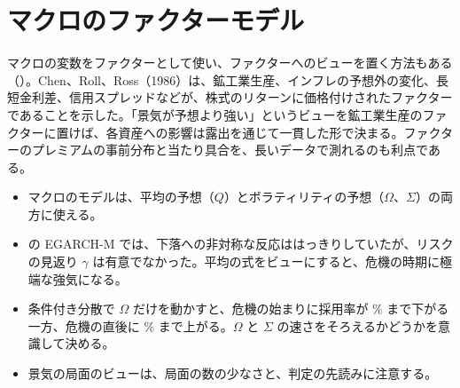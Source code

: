 \section{マクロのファクターモデル}

マクロの変数をファクターとして使い、ファクターへのビューを置く方法もある（）。Chen、Roll、Ross（1986）は、鉱工業生産、インフレの予想外の変化、長短金利差、信用スプレッドなどが、株式のリターンに価格付けされたファクターであることを示した。「景気が予想より強い」というビューを鉱工業生産のファクターに置けば、各資産への影響は露出を通じて一貫した形で決まる。ファクターのプレミアムの事前分布と当たり具合を、長いデータで測れるのも利点である。

\begin{keybox}[この章のまとめ]
\begin{itemize}
\item マクロのモデルは、平均の予想（$Q$）とボラティリティの予想（$\Omega$、$\Sigma$）の両方に使える。
\item \SP{} の EGARCH-M では、下落への非対称な反応ははっきりしていたが、リスクの見返り $\gamma$ は有意でなかった。平均の式をビューにすると、危機の時期に極端な強気になる。
\item 条件付き分散で $\Omega$ だけを動かすと、危機の始まりに採用率が \% まで下がる一方、危機の直後に \% まで上がる。$\Omega$ と $\Sigma$ の速さをそろえるかどうかを意識して決める。
\item 景気の局面のビューは、局面の数の少なさと、判定の先読みに注意する。
\end{itemize}
\end{keybox}
